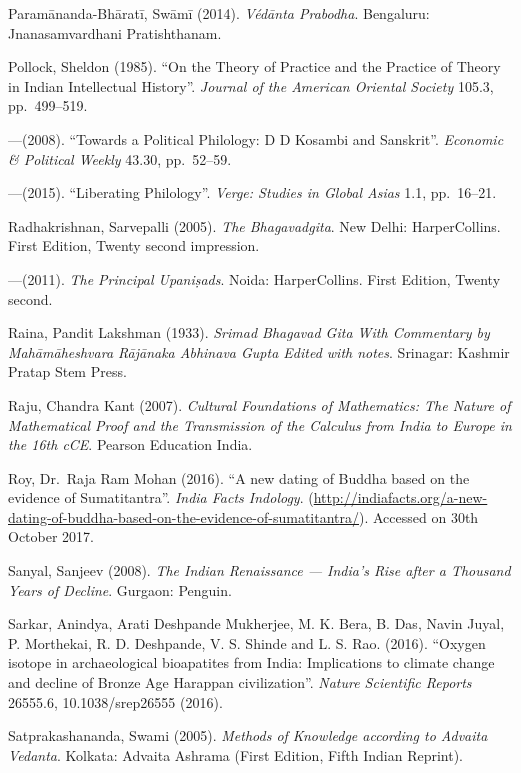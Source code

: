 \begin{thebibliography}{99}
Paramānanda-Bhāratī, Swāmī (2014). {\sl Védānta Prabodha}. Bengaluru: Jnanasamvardhani Pratishthanam.

Pollock, Sheldon (1985). ``On the Theory of Practice and the Practice of Theory in Indian Intellectual History''. {\sl Journal of the American Oriental Society} 105.3, pp.~499--519.

---\kern3pt(2008). ``Towards a Political Philology: D D Kosambi and Sanskrit''. {\sl Economic \& Political Weekly} 43.30, pp.~52--59.

---\kern3pt(2015). ``Liberating Philology''. {\sl Verge: Studies in Global Asias} 1.1, pp.~16--21.

Radhakrishnan, Sarvepalli (2005). {\sl The Bhagavadgita}. New Delhi: HarperCollins. First Edition, Twenty second impression.

---\kern3pt(2011). {\sl The Principal Upaniṣads}. Noida: HarperCollins. First Edition, Twenty second.

Raina, Pandit Lakshman (1933). {\sl Srimad Bhagavad Gita With Commentary by Mahāmāheshvara Rājānaka Abhinava Gupta Edited with notes}. Srinagar: Kashmir Pratap Stem Press.

Raju, Chandra Kant (2007). {\sl Cultural Foundations of Mathematics: The Nature of Mathematical Proof and the Transmission of the Calculus from India to Europe in the 16th cCE}. Pearson Education India.

Roy, Dr.\ Raja Ram Mohan (2016). ``A new dating of Buddha based on the evidence of Sumatitantra''. {\sl India Facts Indology}.
(\url{http://indiafacts.org/a-new-dating-of-buddha-based-on-the-evidence-of-sumatitantra/}). Accessed on 30th October 2017. 

Sanyal, Sanjeev (2008). {\sl The Indian Renaissance --- India's Rise after a Thousand Years of Decline}. Gurgaon: Penguin.

Sarkar, Anindya, Arati Deshpande Mukherjee, M. K. Bera, B. Das, Navin Juyal, P. Morthekai, R. D. Deshpande, V. S. Shinde and L. S. Rao. (2016). ``Oxygen isotope in archaeological bioapatites from India: Implications to climate change and decline of Bronze Age Harappan civilization''. {\sl Nature Scientific Reports} 26555.6, 10.1038/srep26555 (2016).

Satprakashananda, Swami (2005). {\sl Methods of Knowledge according to Advaita Vedanta}. Kolkata: 
Advaita Ashrama (First Edition, Fifth Indian Reprint).


\end{thebibliography}
